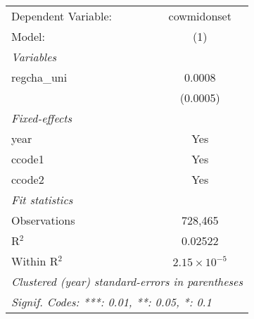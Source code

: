 \begingroup
\centering
\begin{tabular}{lc}
   \tabularnewline \midrule \midrule
   Dependent Variable: & cowmidonset\\  
   Model:              & (1)\\  
   \midrule
   \emph{Variables}\\
   regcha\_uni         & 0.0008\\   
                       & (0.0005)\\   
   \midrule
   \emph{Fixed-effects}\\
   year                & Yes\\  
   ccode1              & Yes\\  
   ccode2              & Yes\\  
   \midrule
   \emph{Fit statistics}\\
   Observations        & 728,465\\  
   R$^2$               & 0.02522\\  
   Within R$^2$        & $2.15\times 10^{-5}$\\   
   \midrule \midrule
   \multicolumn{2}{l}{\emph{Clustered (year) standard-errors in parentheses}}\\
   \multicolumn{2}{l}{\emph{Signif. Codes: ***: 0.01, **: 0.05, *: 0.1}}\\
\end{tabular}
\par\endgroup


